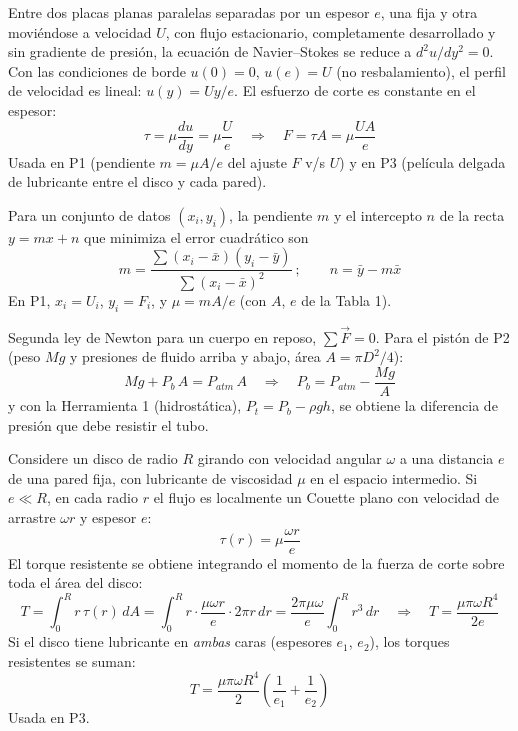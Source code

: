 \documentclass[12pt]{article}
\begin{document}
Entre dos placas planas paralelas separadas por un espesor $e$, una fija y otra movi\'endose
a velocidad $U$, con flujo estacionario, completamente desarrollado y sin gradiente de
presi\'on, la ecuaci\'on de Navier--Stokes se reduce a $d^2u/dy^2=0$. Con las condiciones
de borde $u(0)=0$, $u(e)=U$ (no resbalamiento), el perfil de velocidad es lineal:
$u(y)=Uy/e$. El esfuerzo de corte es constante en el espesor:
\[
\tau=\mu\frac{du}{dy}=\mu\frac{U}{e}
\quad\Longrightarrow\quad
\boxed{F=\tau A=\mu\frac{U A}{e}}
\]
Usada en P1 (pendiente $m=\mu A/e$ del ajuste $F$ v/s $U$) y en P3 (pel\'icula delgada
de lubricante entre el disco y cada pared).


Para un conjunto de datos $(x_i,y_i)$, la pendiente $m$ y el intercepto $n$ de la
recta $y=mx+n$ que minimiza el error cuadr\'atico son
\[
m=\frac{\sum(x_i-\bar x)(y_i-\bar y)}{\sum(x_i-\bar x)^2}\ ;\qquad n=\bar y-m\bar x
\]
En P1, $x_i=U_i$, $y_i=F_i$, y $\mu=mA/e$ (con $A$, $e$ de la Tabla 1).


Segunda ley de Newton para un cuerpo en reposo, $\sum \vec F=0$. Para el pist\'on de
P2 (peso $Mg$ y presiones de fluido arriba y abajo, \'area $A=\pi D^2/4$):
\[
Mg+P_b\,A=P_{atm}\,A
\quad\Longrightarrow\quad
P_b=P_{atm}-\frac{Mg}{A}
\]
y con la Herramienta 1 (hidrost\'atica), $P_t=P_b-\rho g h$, se obtiene la diferencia
de presi\'on que debe resistir el tubo.


Considere un disco de radio $R$ girando con velocidad angular $\omega$ a una distancia
$e$ de una pared fija, con lubricante de viscosidad $\mu$ en el espacio intermedio. Si
$e\ll R$, en cada radio $r$ el flujo es localmente un Couette plano con velocidad de
arrastre $\omega r$ y espesor $e$:
\[
\tau(r)=\mu\frac{\omega r}{e}
\]
El torque resistente se obtiene integrando el momento de la fuerza de corte sobre toda
el \'area del disco:
\[
T=\int_0^R r\,\tau(r)\,dA
=\int_0^R r\cdot\frac{\mu\omega r}{e}\cdot 2\pi r\,dr
=\frac{2\pi\mu\omega}{e}\int_0^R r^3\,dr
\quad\Longrightarrow\quad
\boxed{T=\frac{\mu\pi\omega R^4}{2e}}
\]
Si el disco tiene lubricante en \emph{ambas} caras (espesores $e_1$, $e_2$), los
torques resistentes se suman:
\[
\boxed{T=\frac{\mu\pi\omega R^4}{2}\left(\frac{1}{e_1}+\frac{1}{e_2}\right)}
\]
Usada en P3.
\end{document}
